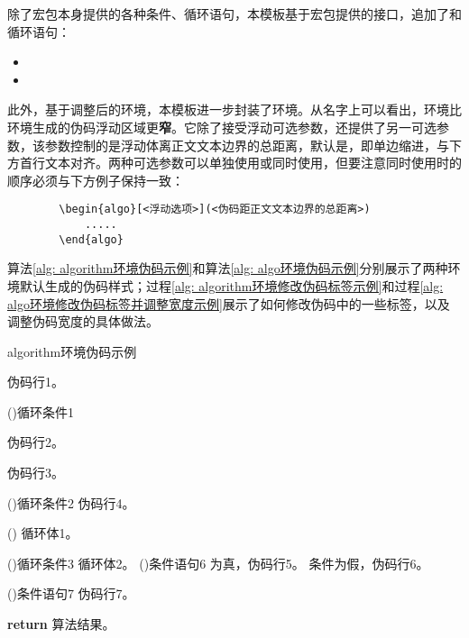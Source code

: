 \documentclass[print, doctor, vlined]{DissertUESTC}
\begin{document}
	除了\href{https://mirrors.sustech.edu.cn/CTAN/macros/latex/contrib/algorithm2e/doc/algorithm2e.pdf}{}宏包本身提供的各种条件、循环语句，本模板基于宏包提供的接口，追加了和循环语句：
	\begin{itemize}
		\item {}
		\item {}
	\end{itemize}
	
	
	此外，基于调整后的环境，本模板进一步封装了环境。从名字上可以看出，环境比环境生成的伪码浮动区域更\textbf{窄}。它除了接受浮动可选参数\shad{[htbp]}，还提供了另一可选参数，该参数控制的是浮动体离正文文本边界的总距离，默认是\shad{4em}，即单边缩进\shad{2em}，与下方首行文本对齐。两种可选参数可以单独使用或同时使用，但要注意同时使用时的顺序必须与下方例子保持一致：
	
	\begin{verbatim}
		\begin{algo}[<浮动选项>](<伪码距正文文本边界的总距离>)
		    .....
		\end{algo}
	\end{verbatim}
	
	算法\ref{alg: algorithm环境伪码示例}和算法\ref{alg: algo环境伪码示例}分别展示了两种环境默认生成的伪码样式；过程\ref{alg: algorithm环境修改伪码标签示例}和过程\ref{alg: algo环境修改伪码标签并调整宽度示例}展示了如何修改伪码中的一些标签，以及调整伪码宽度的具体做法。

	
	\begin{algorithm}[!h]
		\caption{algorithm环境伪码示例} \label{alg: algorithm环境伪码示例}
		伪码行1。
		
		\For(){循环条件1}{
			伪码行2。
			
			伪码行3。
			
			\DoWhile(){循环条件2}{
				伪码行4。
			}
			
			\Loop(){
				循环体1。
			}
			
			\Repeat(){循环条件3}{
				循环体2。
			}
			\eIf(){条件语句6}{
				为真，伪码行5。
			}{
				条件为假，伪码行6。
			}
			
			\If(){条件语句7}{
				伪码行7。
			}
		}
		\textbf{return} 算法结果。
	\end{algorithm}
	
\end{document}
